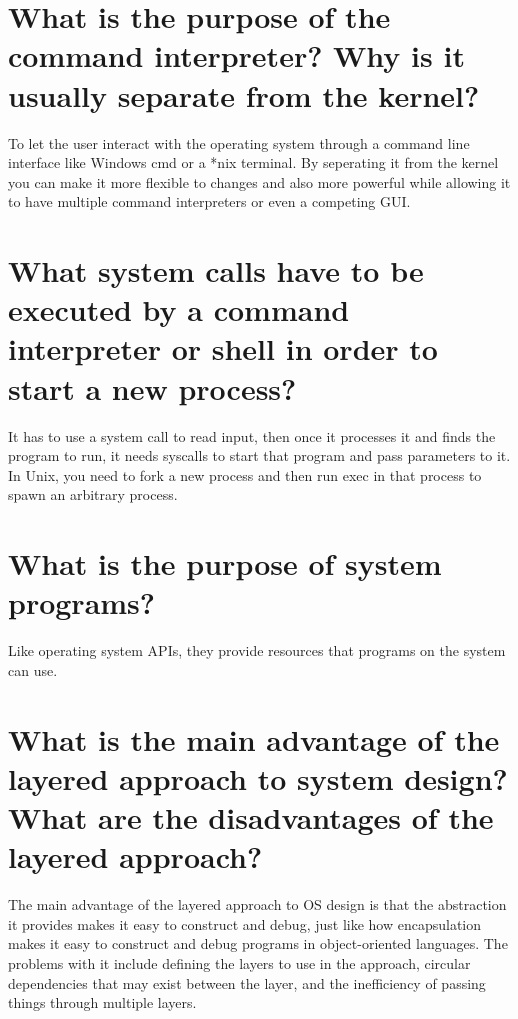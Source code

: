 \documentclass{book}%
\begin{document}
\section{What is the purpose of the command interpreter? Why is it usually separate from the kernel?}
To let the user interact with the operating system through a command line interface like Windows cmd or a *nix terminal. By seperating it from the kernel you can make it more flexible to changes and also more powerful while allowing it to have multiple command interpreters or even a competing GUI. 
\section{What system calls have to be executed by a command interpreter or shell in order to start a new process?}%
It has to use a system call to read input, then once it processes it and finds the program to run, it needs syscalls to start that program and pass parameters to it. \\
In Unix, you need to fork a new process and then run exec in that process to spawn an arbitrary process.
\section{What is the purpose of system programs?}
Like operating system APIs, they provide resources that programs on the system can use.
\section{What is the main advantage of the layered approach to system design? What are the disadvantages of the layered approach?}
The main advantage of the layered approach to OS design is that the abstraction it provides makes it easy to construct and debug, just like how encapsulation makes it easy to construct and debug programs in object-oriented languages. The problems with it include defining the layers to use in the approach, circular dependencies that may exist between the layer, and the inefficiency of passing things through multiple layers.
\end{document}
